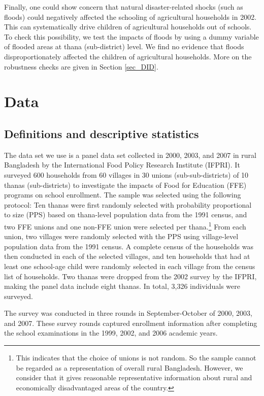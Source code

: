 \documentclass[12pt,letterpaper]{article}
\newcommand{\0}{\ensuremath{\mbox{\boldmath $0$}}}
\begin{document}
Finally, one could show concern that natural disaster-related shocks (such as floods) could negatively affected the schooling of agricultural households in 2002. This can systematically drive children of agricultural households out of schools. To check this possibility, we test the impacts of floods by using a dummy variable of flooded areas at thana (sub-district) level. We find no evidence that floods disproportionately affected the children of agricultural households. More on the robustness checks are given in Section \ref{sec_DID}. 

\section{Data} 
\subsection{Definitions and descriptive statistics}

The data set we use is a panel data set collected in 2000, 2003, and 2007 in rural Bangladesh by the International Food Policy Research Institute (IFPRI). It surveyed 600 households from 60 villages in 30 unions (sub-sub-districts) of 10 thanas (sub-districts) to investigate the impacts of Food for Education (FFE) programs on school enrollment. The sample was selected using the following protocol: Ten thanas were first randomly selected with probability proportional to size (PPS) based on thana-level population data from the 1991 census, and two FFE unions and one non-FFE union were selected per thana.\footnote{This indicates that the choice of unions is not random. So  the sample cannot be regarded as a representation of overall rural Bangladesh. However, we consider that it gives reasonable representative information about rural and economically disadvantaged areas of the country. } From each union, two villages were randomly selected with the PPS using village-level population data from the 1991 census. A complete census of the households was then conducted in each of the selected villages, and ten households that had at least one school-age child were randomly selected in each village from the census list of households. Two thanas were dropped from the 2002 survey by the IFPRI, making the panel data include eight thanas. In total, 3,326 individuals were surveyed. 

The survey was conducted in three rounds in September-October of 2000, 2003, and 2007. These survey rounds captured enrollment information after completing the school examinations in the 1999, 2002, and 2006 academic years. %
\end{document}
